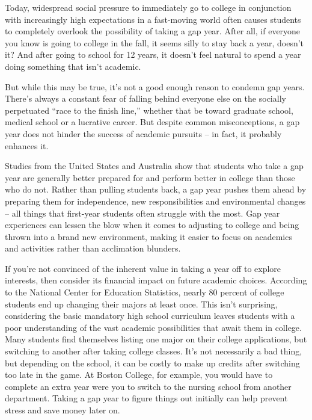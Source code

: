 Today, widespread social pressure to immediately go to college in conjunction with increasingly high expectations in a fast-moving world often causes students to completely overlook the possibility of taking a gap year. After all, if everyone you know is going to college in the fall, it seems silly to stay back a year, doesn't it? And after going to school for 12 years, it doesn't feel natural to spend a year doing something that isn't academic.


But while this may be true, it's not a good enough reason to condemn gap years. There's always a constant fear of falling behind everyone else on the socially perpetuated ``race to the finish line,'' whether that be toward graduate school, medical school or a lucrative career. But despite common misconceptions, a gap year does not hinder the success of academic pursuits – in fact, it probably enhances it.


Studies from the United States and Australia show that students who take a gap year are generally better prepared for and perform better in college than those who do not. Rather than pulling students back, a gap year pushes them ahead by preparing them for independence, new responsibilities and environmental changes – all things that first-year students often struggle with the most. Gap year experiences can lessen the blow when it comes to adjusting to college and being thrown into a brand new environment, making it easier to focus on academics and activities rather than acclimation blunders.


If you're not convinced of the inherent value in taking a year off to explore interests, then consider its financial impact on future academic choices. According to the National Center for Education Statistics, nearly 80 percent of college students end up changing their majors at least once. This isn't surprising, considering the basic mandatory high school curriculum leaves students with a poor understanding of the vast academic possibilities that await them in college. Many students find themselves listing one major on their college applications, but switching to another after taking college classes. It's not necessarily a bad thing, but depending on the school, it can be costly to make up credits after switching too late in the game. At Boston College, for example, you would have to complete an extra year were you to switch to the nursing school from another department. Taking a gap year to figure things out initially can help prevent stress and save money later on.